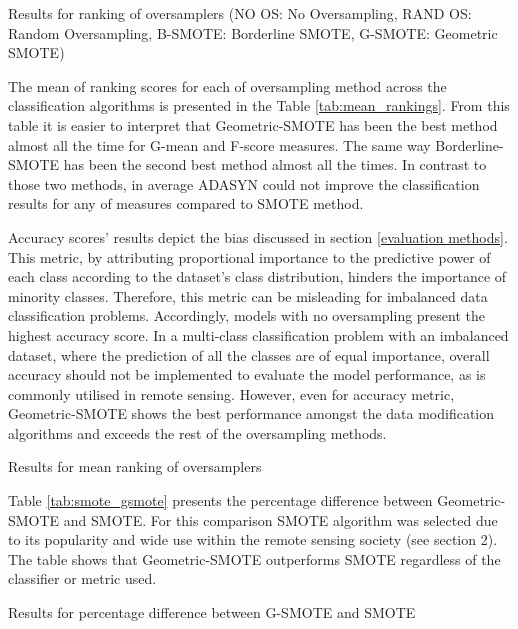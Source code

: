\documentclass[parskip=full]{scrartcl}
\begin{document}
\begin{table}[H]
	\centering
	\caption{\label{tab:ranking} Results for ranking of oversamplers (NO OS: No Oversampling, RAND OS: Random Oversampling, B-SMOTE: Borderline SMOTE, G-SMOTE: Geometric SMOTE)}
\end{table}

The mean of ranking scores for each of oversampling method across the
classification algorithms is presented in the Table \ref{tab:mean_rankings}.
From this table it is easier to interpret that Geometric-SMOTE has been the
best method almost all the time for G-mean and F-score measures. The same way
Borderline-SMOTE has been the second best method almost all the times. In
contrast to those two methods, in average ADASYN could not improve the
classification results for any of measures compared to SMOTE method.

Accuracy scores' results depict the bias discussed in section \ref{evaluation
methods}. This metric, by attributing proportional importance to the
predictive power of each class according to the dataset's class distribution,
hinders the importance of minority classes. Therefore, this metric can be
misleading for imbalanced data classification problems. Accordingly, models
with no oversampling present the highest accuracy score. In a multi-class
classification problem with an imbalanced dataset, where the prediction of all
the classes are of equal importance, overall accuracy should not be implemented
to evaluate the model performance, as is commonly utilised in remote sensing.
However, even for accuracy metric, Geometric-SMOTE shows the best performance
amongst the data modification algorithms and exceeds the rest of the
oversampling methods.


\begin{table}[H]
	\centering
	\caption{\label{tab:mean_rankings} Results for mean ranking of oversamplers}
\end{table}


Table \ref{tab:smote_gsmote} presents the percentage difference  between
Geometric-SMOTE and SMOTE. For this comparison SMOTE algorithm was selected due
to its popularity and wide use within the remote sensing society (see section
2). The table shows that Geometric-SMOTE outperforms SMOTE regardless of the classifier or metric used.

\begin{table}[H]
	\centering
	\caption{\label{tab:smote_gsmote}Results for percentage difference between
		G-SMOTE and SMOTE}
\end{table}
\end{document}

